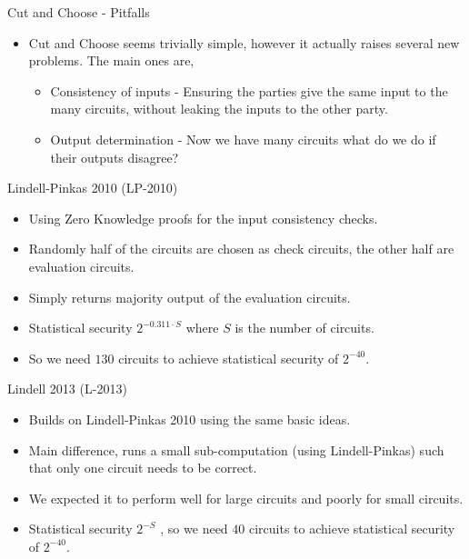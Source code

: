 \documentclass[t, 12pt]{beamer}            %
\begin{document}
\begin{frame}{Cut and Choose - Pitfalls}
	\begin{itemize} %
		\item Cut and Choose seems trivially simple, however it actually raises several new problems. The main ones are,
		\begin{itemize}
			\item Consistency of inputs - Ensuring the parties give the same input to the many circuits, without leaking the inputs to the other party.
			\item Output determination - Now we have many circuits what do we do if their outputs disagree?
		\end{itemize}
	\end{itemize}

\end{frame}


\begin{frame}{Lindell-Pinkas 2010 (LP-2010)}
	\begin{itemize} %
		\item Using Zero Knowledge proofs for the input consistency checks.
		\item Randomly half of the circuits are chosen as check circuits, the other half are evaluation circuits.
		\item Simply returns majority output of the evaluation circuits.
		\item Statistical security $2^{-0.311 \cdot S}$  where $S$ is the number of circuits.
		\item So we need $130$ circuits to achieve statistical security of $2^{-40}$.
	\end{itemize}

\end{frame}


\begin{frame}{Lindell 2013 (L-2013)}
	\begin{itemize} %
		\item Builds on Lindell-Pinkas 2010 using the same basic ideas.  %
		\item Main difference, runs a small sub-computation (using Lindell-Pinkas) such that only one circuit needs to be correct.
		\item We expected it to perform well for large circuits and poorly for small circuits.
		\item Statistical security $2^{-S}$ , so we need $40$ circuits to achieve statistical security of $2^{-40}$.
	\end{itemize}

\end{frame}
\end{document}
